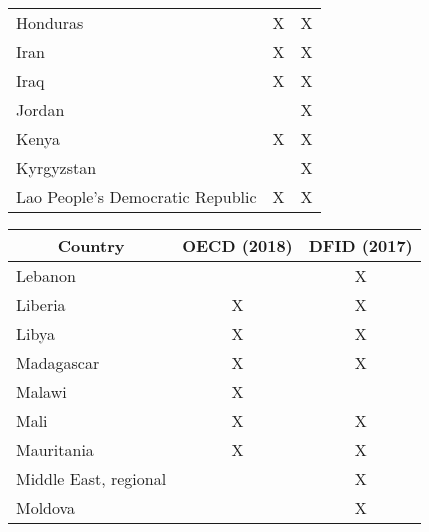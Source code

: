 \begin{table}[htbp]
\begin{tabular}{lcc}
		Honduras                                & \cellcolor[HTML]{E2EFD9}X & \cellcolor[HTML]{E2EFD9}X \\
		Iran                                    & \cellcolor[HTML]{E2EFD9}X & \cellcolor[HTML]{E2EFD9}X \\
		Iraq                                    & \cellcolor[HTML]{E2EFD9}X & \cellcolor[HTML]{E2EFD9}X \\
		Jordan                                  &                           & \cellcolor[HTML]{FBE4D5}X \\
		Kenya                                   & \cellcolor[HTML]{E2EFD9}X & \cellcolor[HTML]{E2EFD9}X \\
		Kyrgyzstan                              &                           & \cellcolor[HTML]{FBE4D5}X \\
		Lao   People's Democratic Republic      & \cellcolor[HTML]{E2EFD9}X & \cellcolor[HTML]{E2EFD9}X \\ \bottomrule
	  \end{tabular}
	  \hspace{1em}
	  \begin{tabular}{lcc}
	  \toprule
		\multicolumn{1}{c}{\textbf{Country}}         & \textbf{OECD} (2018)               & \textbf{DFID} (2017)               \\ \hline
		\rule{0pt}{7pt}Lebanon                                 &                           & \cellcolor[HTML]{FBE4D5}X \\
		Liberia                                 & \cellcolor[HTML]{E2EFD9}X & \cellcolor[HTML]{E2EFD9}X \\
		Libya                                   & \cellcolor[HTML]{E2EFD9}X & \cellcolor[HTML]{E2EFD9}X \\
		Madagascar                              & \cellcolor[HTML]{E2EFD9}X & \cellcolor[HTML]{E2EFD9}X \\
		Malawi                                  & \cellcolor[HTML]{FFF2CC}X &                           \\
		Mali                                    & \cellcolor[HTML]{E2EFD9}X & \cellcolor[HTML]{E2EFD9}X \\
		Mauritania                              & \cellcolor[HTML]{E2EFD9}X & \cellcolor[HTML]{E2EFD9}X \\
		Middle   East, regional                 &                           & \cellcolor[HTML]{FBE4D5}X \\
		Moldova                                 &                           & \cellcolor[HTML]{FBE4D5}X \\

\end{tabular}
\end{table}

